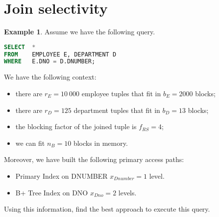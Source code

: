 \documentclass[a4paper, openany]{memoir}
\theoremstyle{definition}
\newtheorem{example}[subsection]{Example}
\begin{document}
\section{Join selectivity}
\begin{example}
    Assume we have the following query.
\begin{lstlisting}[language=SQL]
SELECT  *
FROM    EMPLOYEE E, DEPARTMENT D
WHERE   E.DNO = D.DNUMBER;
\end{lstlisting}
    We have the following context:
    \begin{itemize}
        \item there are $r_E = 10 \ 000$ employee tuples that fit in $b_E = 2000$ blocks;
        \item there are $r_D = 125$ department tuples that fit in $b_D = 13$ blocks;
        \item the blocking factor of the joined tuple is $f_{RS} = 4$;
        \item we can fit $n_B = 10$ blocks in memory.
    \end{itemize}
    Moreover, we have built the following primary access paths:
    \begin{itemize}
        \item Primary Index on DNUMBER $x_{Dnumber} = 1$ level.
        \item B+ Tree Index on DNO $x_{Dno} = 2$ levels.
    \end{itemize}
    Using this information, find the best approach to execute this query.
\end{example}
\end{document}
